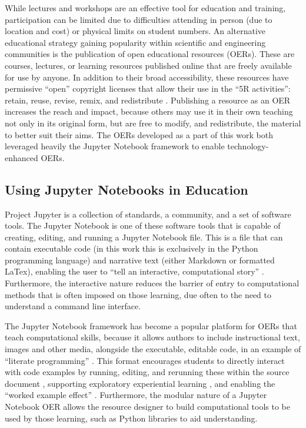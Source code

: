 While lectures and workshops are an effective tool for education and training, participation can be limited due to difficulties attending in person (due to location and cost) or physical limits on student numbers.
An alternative educational strategy gaining popularity within scientific and engineering communities is the publication of open educational resources (OERs). These are courses, lectures, or learning resources published online that are freely available for use by anyone.
In addition to their broad accessibility, these resources have permissive ``open'' copyright licenses that allow their use in the ``5R activities'': retain, reuse, revise, remix, and redistribute \cite{wiley_open_nodate}.
Publishing a resource as an OER increases the reach and impact, because others may use it in their own teaching not only in its original form, but are free to modify, and redistribute, the material to better suit their aims.
The OERs developed as a part of this work both leveraged heavily the Jupyter Notebook framework \cite{kluyver_jupyter_2016} to enable technology-enhanced OERs.

\subsection{Using Jupyter Notebooks in Education}
Project Jupyter \cite{kluyver_jupyter_2016} is a collection of standards, a community, and a set of software tools.
The Jupyter Notebook is one of these software tools that is capable of creating, editing, and running a Jupyter Notebook file.
This is a file that can contain executable code (in this work this is exclusively in the Python programming language) and narrative text (either Markdown or formatted LaTex), enabling the user to ``tell an interactive, computational story'' \cite{barba_teaching_2019}.
Furthermore, the interactive nature reduces the barrier of entry to computational methods that is often imposed on those learning, due often to the need to understand a command line interface.

The Jupyter Notebook framework has become a popular platform for OERs that teach computational skills, because it allows authors to include instructional text, images and other media, alongside the executable, editable code, in an example of ``literate programming'' \cite{knuth_literate_1984}.
This format encourages students to directly interact with code examples by running, editing, and rerunning these within the source document \cite{barba_cybertraining_2017}, supporting exploratory experiential learning \cite{papert_mindstroms_1993}, and enabling the ``worked example effect'' \cite{tarmizi_guidance_1988}.
Furthermore, the modular nature of a Jupyter Notebook OER allows the resource designer to build computational tools to be used by those learning, such as Python libraries to aid understanding.

